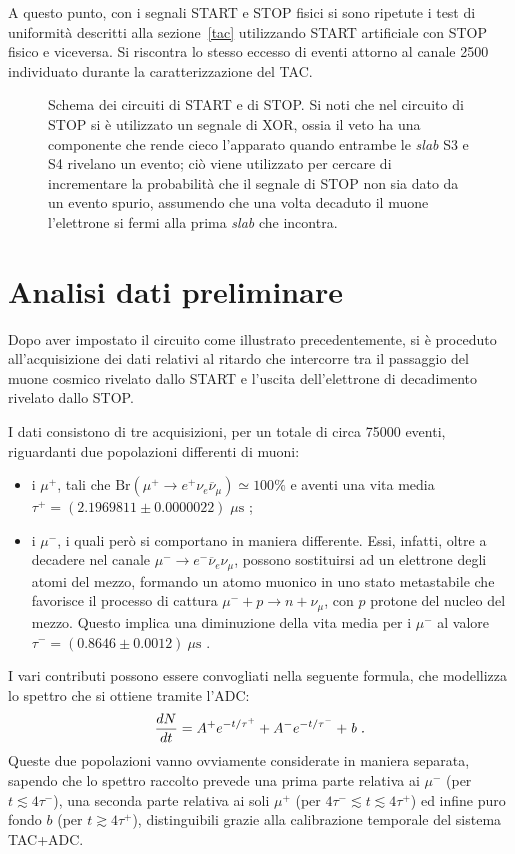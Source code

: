 \documentclass[10pt, oneside, a4paper]{article}   	%
\begin{document}
A questo punto, con i segnali START e STOP fisici si sono ripetute i test di uniformità descritti alla sezione~\ref{tac} utilizzando START artificiale con STOP fisico e viceversa. Si riscontra lo stesso eccesso di eventi attorno al canale 2500 individuato durante la caratterizzazione del TAC.
%
\begin{figure}[h]
	\centering
	
	\caption{Schema dei circuiti di START e di STOP. Si noti che nel circuito di STOP si è utilizzato un segnale di XOR, ossia il veto ha una componente che rende cieco l'apparato quando entrambe le \emph{slab} S3 e S4 rivelano un evento; ciò viene utilizzato per cercare di incrementare la probabilità che il segnale di STOP non sia dato da un evento spurio, assumendo che una volta decaduto il muone l'elettrone si fermi alla prima \emph{slab} che incontra.}
	\label{scemi}
\end{figure}
%
\section{Analisi dati preliminare}
\label{analPrelim}
Dopo aver impostato il circuito come illustrato precedentemente, si è proceduto all'acquisizione dei dati relativi al ritardo che intercorre tra il passaggio del muone cosmico rivelato dallo START e l'uscita dell'elettrone di decadimento rivelato dallo STOP.

I dati consistono di tre acquisizioni, per un totale di circa 75000 eventi, riguardanti due popolazioni differenti di muoni:
\begin{itemize}
  \item i $\mu^+$, tali che $\mbox{Br}(\mu^+ \to e^+\nu_e\overline{\nu}_\mu)\simeq 100 \%$ e aventi una vita media \linebreak $\tau^+=(2.1969811 \pm 0.0000022)\;\mu\mbox{s}$ \cite{pdg};
  \item i $\mu^-$, i quali però si comportano in maniera differente. Essi, infatti, oltre a decadere nel canale $\mu^-\to e^-\overline{\nu}_e\nu_\mu$, possono sostituirsi ad un elettrone degli atomi del mezzo, formando un atomo muonico in uno stato metastabile che favorisce il processo di cattura $\mu^-+p\to n+\nu_\mu $, con $p$ protone del nucleo del mezzo. Questo implica una diminuzione della vita media per i $\mu^-$ al valore $\tau^-=(0.8646 \pm 0.0012) \ \mu \mbox{s}$ \cite{al}.
\end{itemize}

I vari contributi possono essere convogliati nella seguente formula, che modellizza lo spettro che si ottiene tramite l'ADC:
 \[  \frac{dN}{dt} = A^+ e^{-t/\tau^+} + A^- e^{-t/\tau^-} + \mbox{\emph{b\;.}} \]
Queste due popolazioni vanno ovviamente considerate in maniera separata, sapendo che lo spettro raccolto prevede una prima parte relativa ai $\mu^-$ (per $t\lesssim4\tau^-$), una seconda parte relativa ai soli $\mu^+$ (per $4\tau^-\lesssim t\lesssim 4\tau^+$) ed infine puro fondo $b$ (per $t\gtrsim4\tau^+$), distinguibili grazie alla calibrazione temporale del sistema TAC+ADC.
\end{document}
